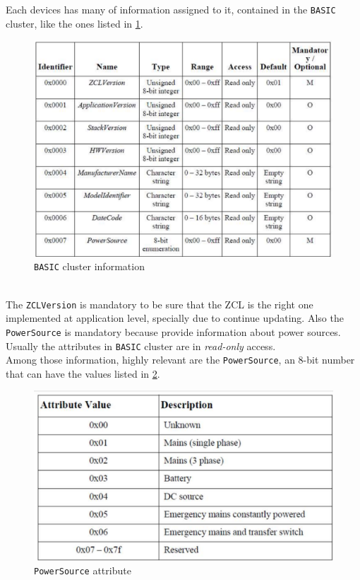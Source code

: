 \documentclass[10pt,a4paper]{report}
\theoremstyle{definition}
\begin{document}
Each devices has many of information assigned to it, contained in the \texttt{BASIC} cluster, like the ones listed in \ref{basic-cluster-info}.
\begin{figure}[h!]
	\centering\includegraphics[scale=0.30]{images/Pasted image 20230311170348.png}
	\caption{\texttt{BASIC} cluster information}
	\label{basic-cluster-info}

\end{figure}\\
The \texttt{ZCLVersion} is mandatory to be sure that the ZCL is the right one implemented at application level, specially due to continue updating.
Also the  \texttt{PowerSource} is mandatory because provide information about power sources. Usually the  attributes in \texttt{BASIC} cluster are in \textit{read-only} access.\\
Among those information, highly relevant are the \texttt{PowerSource}, an 8-bit number that can have the values listed in \ref{powersource-values}. 
\begin{figure}[h!]
	\centering\includegraphics[scale=0.20]{images/Pasted image 20230311170452.png}
	\caption{\texttt{PowerSource} attribute}
	\label{powersource-values}

\end{figure}\\
\end{document}

